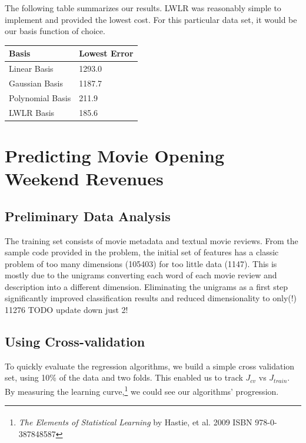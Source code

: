 \documentclass[11pt, oneside]{article}   	%
\begin{document}
The following table summarizes our results. LWLR was reasonably simple to implement and provided the lowest cost. For this particular data set, it would be our basis function of choice.

\begin{center}
    \begin{tabular}{| l | l |}
    \hline
    Basis & Lowest Error \\ \hline
    Linear Basis & \hfill 1293.0 \\
    Gaussian Basis & \hfill 1187.7 \\
    Polynomial Basis & \hfill 211.9 \\
    LWLR Basis & \hfill 185.6 \\
    \hline
    \end{tabular}
\end{center}


\section*{Predicting Movie Opening Weekend Revenues}


\subsection*{Preliminary Data Analysis}

The training set consists of movie metadata and textual movie reviews. From the sample code provided in the problem, the initial set of features has a classic problem of too many dimensions (105403) for too little data (1147).  This is mostly due to the unigrams converting each word of each movie review and description into a different dimension. Eliminating the unigrams as a first step significantly improved classification results and reduced dimensionality to only(!) 11276 TODO update down just 2!

\subsection*{Using Cross-validation}

To quickly evaluate the regression algorithms, we build a simple cross validation set, using 10\% of the data and two folds. This enabled us to track $J_{cv}$ vs $J_{train}$. By measuring the learning curve,\footnote{\emph{The Elements of Statistical Learning} by Hastie, et al. \textsuperscript{\textcopyright} 2009 ISBN 978-0-387848587} we could see our algorithms' progression.
\end{document}
